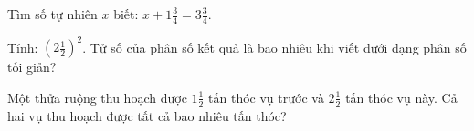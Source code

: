 \begin{ex}
  Tìm số tự nhiên $x$ biết: $x + 1\frac{3}{4} = 3\frac{3}{4}$.
\end{ex}

\begin{ex}
  Tính: $(2\frac{1}{2})^2$. Tử số của phân số kết quả là bao nhiêu khi viết dưới dạng phân số tối giản?
\end{ex}

\begin{ex}
  Một thửa ruộng thu hoạch được $1\frac{1}{2}$ tấn thóc vụ trước và $2\frac{1}{2}$ tấn thóc vụ này. Cả hai vụ thu hoạch được tất cả bao nhiêu tấn thóc?
\end{ex}
